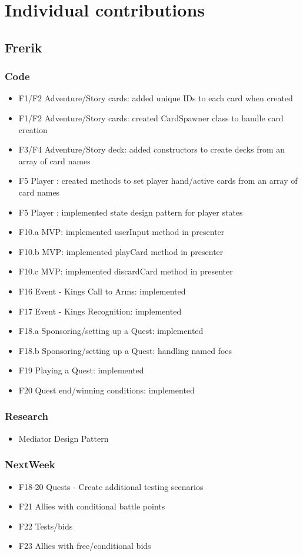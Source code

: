 \documentclass[10pt,a4paper]{article}
\begin{document}
\newpage
\section*{Individual contributions}
\subsection*{Frerik}

\subsubsection*{Code}
\begin{itemize}
\item F1/F2 Adventure/Story cards: added unique IDs to each card when created
\item F1/F2 Adventure/Story cards: created CardSpawner class to handle card creation
\item F3/F4 Adventure/Story deck: added constructors to create decks from an array of card names
\item F5 Player : created methods to set player hand/active cards from an array of card names
\item F5 Player : implemented state design pattern for player states
\item F10.a MVP: implemented userInput method in presenter
\item F10.b MVP: implemented playCard method in presenter 
\item F10.c MVP: implemented discardCard method in presenter
\item F16 Event - Kings Call to Arms: implemented
\item F17 Event - Kings Recognition: implemented
\item F18.a Sponsoring/setting up a Quest: implemented
\item F18.b Sponsoring/setting up a Quest: handling named foes
\item F19 Playing a Quest: implemented
\item F20 Quest end/winning conditions: implemented
\end{itemize}
\subsubsection*{Research}
\begin{itemize}
\item Mediator Design Pattern
\end{itemize}
\subsubsection*{NextWeek}
\begin{itemize}
\item F18-20 Quests - Create additional testing scenarios
\item F21 Allies with conditional battle points
\item F22 Tests/bids
\item F23 Allies with free/conditional bids
\end{itemize}
\end{document}
